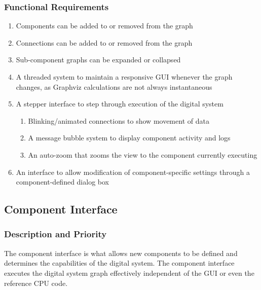 \documentclass[12pt]{article}
\begin{document}
\subsubsection{Functional Requirements}
\begin{enumerate}
\item Components can be added to or removed from the graph
\item Connections can be added to or removed from the graph
\item Sub-component graphs can be expanded or collapsed
\item A threaded system to maintain a responsive GUI whenever the graph changes, as Graphviz calculations are not always instantaneous
\item A stepper interface to step through execution of the digital system
\begin{enumerate}
\item Blinking/animated connections to show movement of data
\item A message bubble system to display component activity and logs
\item An auto-zoom that zooms the view to the component currently executing
\end{enumerate}
\item An interface to allow modification of component-specific settings through a component-defined dialog box
\end{enumerate}

\subsection{Component Interface}

\subsubsection{Description and Priority}
The component interface is what allows new components to be defined and determines the capabilities of the digital system. The component interface executes the digital system graph effectively independent of the GUI or even the reference CPU code.
\end{document}
